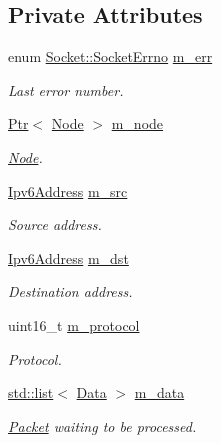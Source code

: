 \subsection*{Private Attributes}
\begin{DoxyCompactItemize}
\item 
enum \hyperlink{classns3_1_1Socket_ada1328c5ae0c28cb2a982caf8f6d6cca}{Socket\+::\+Socket\+Errno} \hyperlink{classns3_1_1Ipv6RawSocketImpl_afabd1db84eac91197faac4f4852d8681}{m\+\_\+err}
\begin{DoxyCompactList}\small\item\em Last error number. \end{DoxyCompactList}\item 
\hyperlink{classns3_1_1Ptr}{Ptr}$<$ \hyperlink{classns3_1_1Node}{Node} $>$ \hyperlink{classns3_1_1Ipv6RawSocketImpl_a2afa14d1f4c1f729c989c00e3ad350fb}{m\+\_\+node}
\begin{DoxyCompactList}\small\item\em \hyperlink{classns3_1_1Node}{Node}. \end{DoxyCompactList}\item 
\hyperlink{classns3_1_1Ipv6Address}{Ipv6\+Address} \hyperlink{classns3_1_1Ipv6RawSocketImpl_a33e8cd6e8ef2da88c6a8e954f23048d0}{m\+\_\+src}
\begin{DoxyCompactList}\small\item\em Source address. \end{DoxyCompactList}\item 
\hyperlink{classns3_1_1Ipv6Address}{Ipv6\+Address} \hyperlink{classns3_1_1Ipv6RawSocketImpl_ac1bd7e150da6118befd78831b483c0ca}{m\+\_\+dst}
\begin{DoxyCompactList}\small\item\em Destination address. \end{DoxyCompactList}\item 
uint16\+\_\+t \hyperlink{classns3_1_1Ipv6RawSocketImpl_ac745a953c5ec673bd89b170eaadab548}{m\+\_\+protocol}
\begin{DoxyCompactList}\small\item\em Protocol. \end{DoxyCompactList}\item 
\hyperlink{openflow-interface_8h_afd9bcfa176617760671b67580f536fa7}{std\+::list}$<$ \hyperlink{structns3_1_1Ipv6RawSocketImpl_1_1Data}{Data} $>$ \hyperlink{classns3_1_1Ipv6RawSocketImpl_ae01fe78981765eec9f036e4cd657c73a}{m\+\_\+data}
\begin{DoxyCompactList}\small\item\em \hyperlink{classns3_1_1Packet}{Packet} waiting to be processed. \end{DoxyCompactList}\item 

\end{DoxyCompactItemize}

